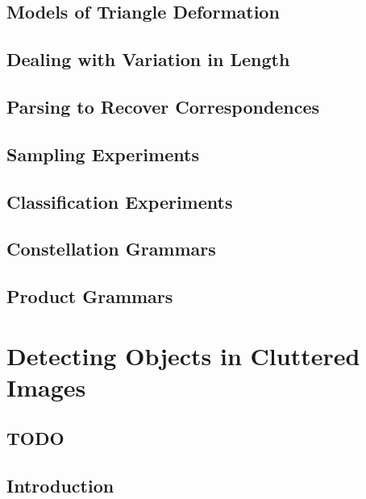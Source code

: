 \documentclass{book}
\begin{document}
  \section{Models of Triangle Deformation}
    \label{sec-models-triangle}
    

  \section{Dealing with Variation in Length}
    \label{sec-models-dirichlet}
    

  \section{Parsing to Recover Correspondences}
    \label{sec-models-parsing}
    

  \section{Sampling Experiments}
  \section{Classification Experiments}
  \section{Constellation Grammars}
  \section{Product Grammars}

\chapter{Detecting Objects in Cluttered Images}
  \label{chap-detection}

  \section{TODO}
      

  \section{Introduction}
    \label{sec-detection-intro}
    
\end{document}
